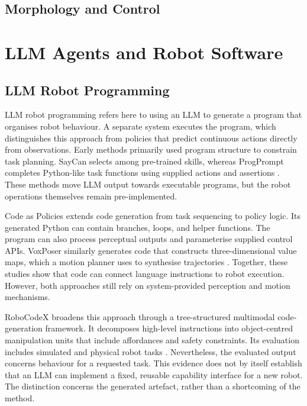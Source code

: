 \subsection{Morphology and Control}
\label{sec:morphology-control}

\section{LLM Agents and Robot Software}
\label{sec:llm-agents-robot-software}

\subsection{LLM Robot Programming}
\label{sec:llm-robot-programming}

LLM robot programming refers here to using an LLM to generate a program that
organises robot behaviour. A separate system executes the program, which
distinguishes this approach from policies that predict continuous actions
directly from observations. Early methods primarily used program structure to
constrain task planning. SayCan selects among pre-trained skills, whereas
ProgPrompt completes Python-like task functions using supplied actions and
assertions \citep{ahn2022saycan,singh2023progprompt}. These methods move LLM
output towards executable programs, but the robot operations themselves remain
pre-implemented.

Code as Policies extends code generation from task sequencing to policy logic.
Its generated Python can contain branches, loops, and helper functions. The
program can also process perceptual outputs and parameterise supplied control
APIs. VoxPoser similarly generates code that constructs three-dimensional
value maps, which a motion planner uses to synthesise trajectories
\citep{liang2023codeaspolicies,huang2023voxposer}. Together, these studies show
that code can connect language instructions to robot execution. However, both
approaches still rely on system-provided perception and motion mechanisms.

RoboCodeX broadens this approach through a tree-structured multimodal
code-generation framework. It decomposes high-level instructions into
object-centred manipulation units that include affordances and safety
constraints. Its evaluation includes simulated and physical robot tasks
\citep{mu2024robocodex}. Nevertheless, the evaluated output concerns behaviour
for a requested task. This evidence does not by itself establish that an LLM
can implement a fixed, reusable capability interface for a new robot. The
distinction concerns the generated artefact, rather than a shortcoming of the
method.


